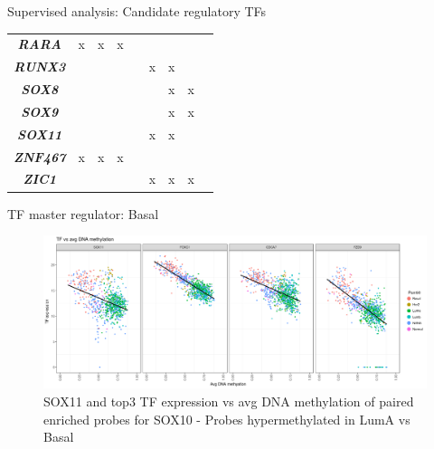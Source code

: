 \documentclass[slidestop,compress,11pt,xcolor=dvipsnames]{beamer}
\begin{document}
\begin{frame}{Supervised analysis: Candidate regulatory TFs }
\begin{table}[]
\begin{tabular}{@{}|c|c|c|c|c|c|c|c|c|@{}}
\textit{\textbf{RARA}} & x & x & x &  &  &  &  &  \\
\textit{\textbf{RUNX3}} &  &  &  &  & x & x &  &  \\
\textit{\textbf{SOX8}} &  &  &  &  &  & x & x &  \\
\textit{\textbf{SOX9}} &  &  &  &  &  & x & x &  \\
\textit{\textbf{SOX11}} &  &  &  &  & x & x &  &  \\
\textit{\textbf{ZNF467}} & x & x & x &  &  &  &  &  \\
\textit{\textbf{ZIC1}} &  &  &  &  & x & x & x &  \\ \bottomrule
\end{tabular}
\end{table}
\end{frame}






\begin{frame}{TF master regulator: Basal}

 \begin{figure}[ht!]
  \centering
  \includegraphics[width=1.0\textwidth]{ELMER/SOX10_TF.png}
  \caption{\label{fig:chiapet} SOX11 and top3 TF expression vs avg DNA methylation of paired enriched probes for SOX10 - Probes hypermethylated in LumA vs Basal}
 \end{figure}
\end{frame}
\end{document}
